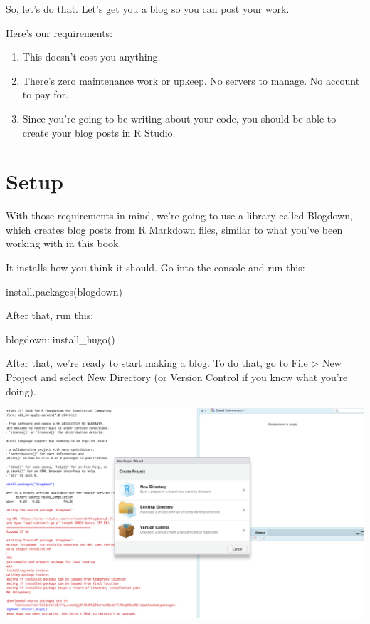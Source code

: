 \documentclass[
]{book}
\newenvironment{Shaded}{\begin{snugshade}}{\end{snugshade}}
\newcommand{\FunctionTok}[1]{\textcolor[rgb]{0.00,0.00,0.00}{#1}}
\newcommand{\NormalTok}[1]{#1}
\newcommand{\SpecialCharTok}[1]{\textcolor[rgb]{0.00,0.00,0.00}{#1}}
\newcommand{\StringTok}[1]{\textcolor[rgb]{0.31,0.60,0.02}{#1}}
\providecommand{\tightlist}{%
  \setlength{\itemsep}{0pt}\setlength{\parskip}{0pt}}
\begin{document}
So, let's do that. Let's get you a blog so you can post your work.

Here's our requirements:

\begin{enumerate}
\def\labelenumi{\arabic{enumi}.}
\tightlist
\item
  This doesn't cost you anything.
\item
  There's zero maintenance work or upkeep. No servers to manage. No account to pay for.
\item
  Since you're going to be writing about your code, you should be able to create your blog posts in R Studio.
\end{enumerate}

\hypertarget{setup}{%
\section{Setup}\label{setup}}

With those requirements in mind, we're going to use a library called Blogdown, which creates blog posts from R Markdown files, similar to what you've been working with in this book.

It installs how you think it should. Go into the console and run this:

\begin{Shaded}
\begin{Highlighting}[]
\FunctionTok{install.packages}\NormalTok{(}\StringTok{\textquotesingle{}blogdown\textquotesingle{}}\NormalTok{) }
\end{Highlighting}
\end{Shaded}

After that, run this:

\begin{Shaded}
\begin{Highlighting}[]
\NormalTok{blogdown}\SpecialCharTok{::}\FunctionTok{install\_hugo}\NormalTok{()}
\end{Highlighting}
\end{Shaded}

After that, we're ready to start making a blog. To do that, go to File \textgreater{} New Project and select New Directory (or Version Control if you know what you're doing).

\includegraphics[width=19.61in]{images/blog1}
\end{document}
